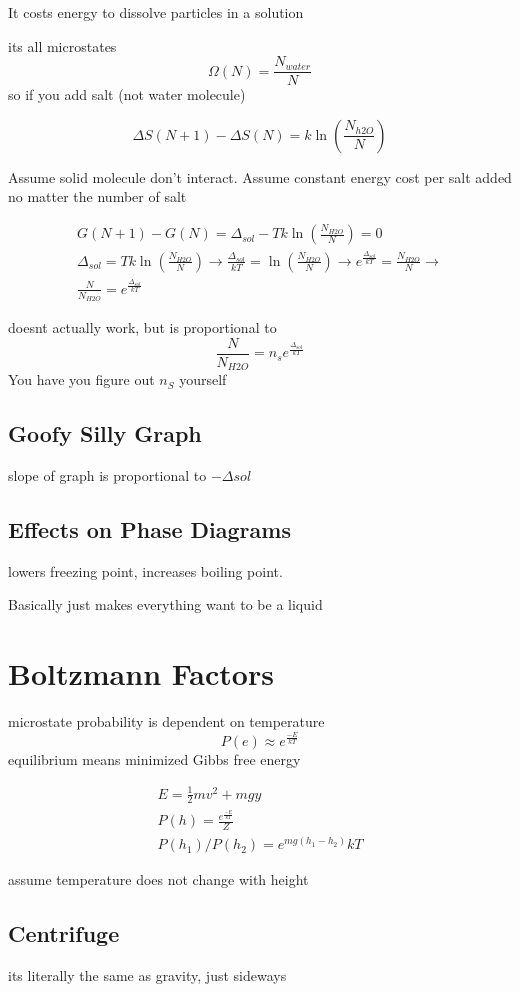 \documentclass[fleqn]{report}
\newcommand{\equations}[1]{
\begin{gather*}
#1
\end{gather*}
}
\begin{document}
It costs energy to dissolve particles in a solution

its all microstates
\[
\Omega(N) = \frac{N_{water}}{N} 
\]
so if you add salt (not water molecule)

\[
\Delta S(N + 1) - \Delta S(N) = k \ln (\frac{N_{h2O}}{N})
\]

Assume solid molecule don't interact. Assume constant energy cost per salt added no matter the number of salt

\equations{
G(N + 1) - G(N) = \Delta_{sol} - Tk \ln (\frac{N_{H2O}}{N}) = 0
\\
\Delta_{sol} = Tk \ln (\frac{N_{H2O}}{N})
\rightarrow
\frac{\Delta_{sol}}{kT} = \ln (\frac{N_{H2O}}{N})
\rightarrow
e^{\frac{\Delta_{sol}}{kT}} = \frac{N_{H2O}}{N}
\rightarrow
\\
\frac{N}{N_{H2O}} = e^{\frac{\Delta_{sol}}{kT}}
}
doesnt actually work, but is proportional to
\[
\frac{N}{N_{H2O}} = n_s e^{\frac{\Delta_{sol}}{kT}}
\]
You have you figure out $n_S$ yourself

\subsection{Goofy Silly Graph}
slope of graph is proportional to $- \Delta{sol}$

\subsection{Effects on Phase Diagrams}
lowers freezing point, increases boiling point.

Basically just makes everything want to be a liquid

\section{Boltzmann Factors}
microstate probability is dependent on temperature
\[
P(e) \approx e^{\frac{-E}{k T}}
\]
equilibrium means minimized Gibbs free energy
\equations{
E = \frac{1}{2} mv^2 + mgy
\\
P(h) = \frac{e^{\frac{-E}{kT}}}{Z}
\\
P(h_1)/P(h_2) = e^{mg (h_1 - h_2)}{kT}
}
assume temperature does not change with height

\subsection{Centrifuge}
its literally the same as gravity, just sideways
\end{document}
